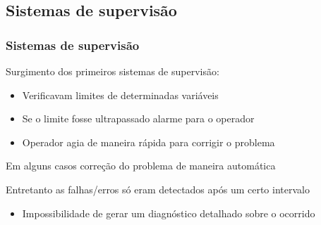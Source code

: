 \documentclass{beamer}
\begin{document}
\subsection{Sistemas de supervisão}
\begin{frame}
    \frametitle{Sistemas de supervisão}

    Surgimento dos primeiros sistemas de supervisão:

\begin{itemize}
    \item Verificavam limites de determinadas variáveis
    \item Se o limite fosse ultrapassado \implica alarme para o operador
    \item Operador agia de maneira rápida para corrigir o problema
\end{itemize}

    Em alguns casos \implica correção do problema de maneira automática

    \vspace{0.25cm}

    Entretanto as falhas/erros só eram detectados após um certo intervalo

\begin{itemize}
    \item Impossibilidade de gerar um diagnóstico detalhado sobre o ocorrido
\end{itemize}

\end{frame}
\end{document}
